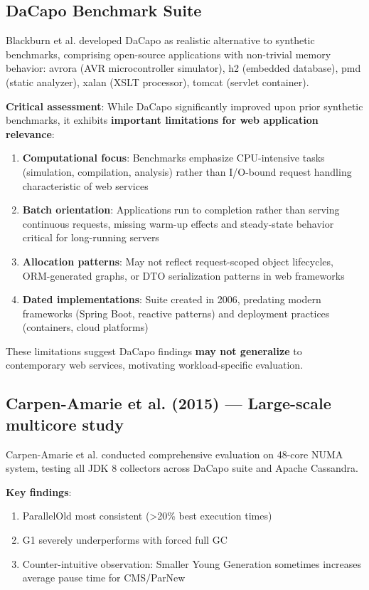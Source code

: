 \subsection{DaCapo Benchmark Suite}
\label{subsec:dacapo}

Blackburn et al. \cite{blackburn2006dacapo} developed DaCapo as realistic alternative to synthetic benchmarks, comprising open-source applications with non-trivial memory behavior: avrora (AVR microcontroller simulator), h2 (embedded database), pmd (static analyzer), xalan (XSLT processor), tomcat (servlet container).

\textbf{Critical assessment}: While DaCapo significantly improved upon prior synthetic benchmarks, it exhibits \textbf{important limitations for web application relevance}:

\begin{enumerate}
    \item \textbf{Computational focus}: Benchmarks emphasize CPU-intensive tasks (simulation, compilation, analysis) rather than I/O-bound request handling characteristic of web services
    \item \textbf{Batch orientation}: Applications run to completion rather than serving continuous requests, missing warm-up effects and steady-state behavior critical for long-running servers
    \item \textbf{Allocation patterns}: May not reflect request-scoped object lifecycles, ORM-generated graphs, or DTO serialization patterns in web frameworks
    \item \textbf{Dated implementations}: Suite created in 2006, predating modern frameworks (Spring Boot, reactive patterns) and deployment practices (containers, cloud platforms)
\end{enumerate}

These limitations suggest DaCapo findings \textbf{may not generalize} to contemporary web services, motivating workload-specific evaluation.

\subsection{Carpen-Amarie et al. (2015) --- Large-scale multicore study}
\label{subsec:carpen-study}

Carpen-Amarie et al. \cite{carpen2015performance} conducted comprehensive evaluation on 48-core NUMA system, testing all JDK 8 collectors across DaCapo suite and Apache Cassandra.

\textbf{Key findings}:
\begin{enumerate}
    \item ParallelOld most consistent (>20\% best execution times)
    \item G1 severely underperforms with forced full GC
    \item Counter-intuitive observation: Smaller Young Generation sometimes increases average pause time for CMS/ParNew
\end{enumerate}

